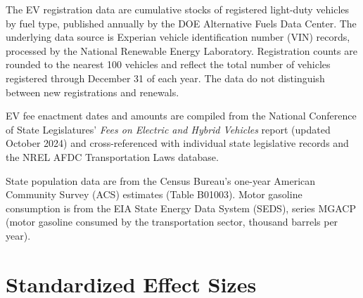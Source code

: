 \documentclass[12pt]{article}
\begin{document}
The EV registration data are cumulative stocks of registered light-duty vehicles by fuel type, published annually by the DOE Alternative Fuels Data Center. The underlying data source is Experian vehicle identification number (VIN) records, processed by the National Renewable Energy Laboratory. Registration counts are rounded to the nearest 100 vehicles and reflect the total number of vehicles registered through December 31 of each year. The data do not distinguish between new registrations and renewals.

EV fee enactment dates and amounts are compiled from the National Conference of State Legislatures' \textit{Fees on Electric and Hybrid Vehicles} report (updated October 2024) and cross-referenced with individual state legislative records and the NREL AFDC Transportation Laws database.

State population data are from the Census Bureau's one-year American Community Survey (ACS) estimates (Table B01003). Motor gasoline consumption is from the EIA State Energy Data System (SEDS), series MGACP (motor gasoline consumed by the transportation sector, thousand barrels per year).

\section{Standardized Effect Sizes}
\label{sec:sde}


\end{document}
